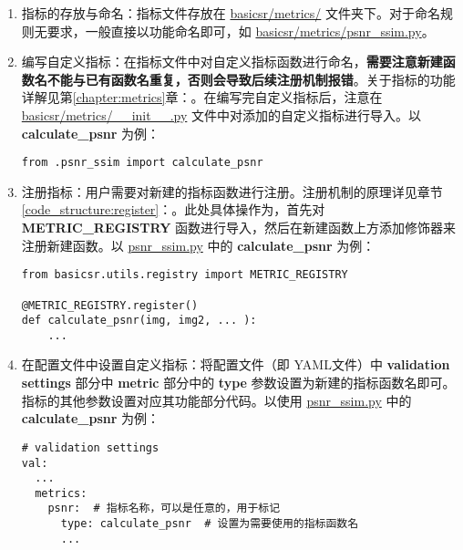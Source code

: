 \documentclass[../main.tex]{subfiles}
\begin{document}
\begin{enumerate}[第 1 步]
    \item 指标的存放与命名：指标文件存放在 \href{https://github.com/XPixelGroup/BasicSR/tree/master/basicsr/metrics}{basicsr/metrics/} 文件夹下。对于命名规则无要求，一般直接以功能命名即可，如 \href{https://github.com/XPixelGroup/BasicSR/tree/master/basicsr/metrics/psnr_ssim.py}{basicsr/metrics/psnr\_ssim.py}。

    \item 编写自定义指标：在指标文件中对自定义指标函数进行命名，\textbf{需要注意新建函数名不能与已有函数名重复，否则会导致后续注册机制报错}。关于指标的功能详解见第\ref{chapter:metrics}章：。在编写完自定义指标后，注意在 \href{https://github.com/XPixelGroup/BasicSR/tree/master/basicsr/metrics/__init__.py}{basicsr/metrics/\_\_init\_\_.py} 文件中对添加的自定义指标进行导入。以 \textbf{calculate\_psnr} 为例：
          \begin{verbatim}
from .psnr_ssim import calculate_psnr
\end{verbatim}

    \item 注册指标：用户需要对新建的指标函数进行注册。注册机制的原理详见章节\ref{code_structure:register}：。此处具体操作为，首先对 \textbf{METRIC\_REGISTRY} 函数进行导入，然后在新建函数上方添加修饰器来注册新建函数。以 \href{https://github.com/XPixelGroup/BasicSR/tree/master/basicsr/metrics/psnr_ssim.py}{psnr\_ssim.py} 中的 \textbf{calculate\_psnr} 为例：
          \begin{verbatim}
from basicsr.utils.registry import METRIC_REGISTRY

@METRIC_REGISTRY.register()
def calculate_psnr(img, img2, ... ):
    ...
\end{verbatim}

    \item 在配置文件中设置自定义指标：将配置文件（即 YAML文件）中 \textbf{validation settings} 部分中 \textbf{metric} 部分中的  \textbf{type} 参数设置为新建的指标函数名即可。指标的其他参数设置对应其功能部分代码。以使用 \href{https://github.com/XPixelGroup/BasicSR/tree/master/basicsr/metrics/psnr_ssim.py}{psnr\_ssim.py} 中的 \textbf{calculate\_psnr} 为例：
          \begin{verbatim}
# validation settings
val:
  ...
  metrics:
    psnr:  # 指标名称，可以是任意的，用于标记
      type: calculate_psnr  # 设置为需要使用的指标函数名
      ...
\end{verbatim}
\end{enumerate}
\end{document}
